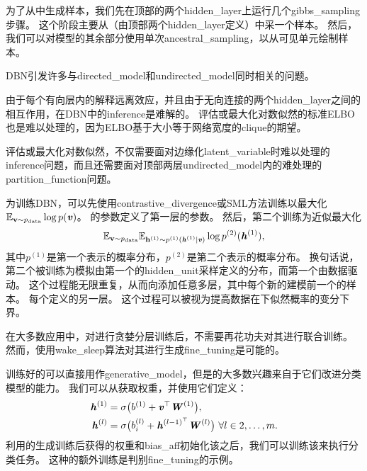 
为了从中生成样本，我们先在顶部的两个\gls{hidden_layer}上运行几个\gls{gibbs_sampling}步骤。
这个阶段主要从（由顶部两个\gls{hidden_layer}定义）中采一个样本。
然后，我们可以对模型的其余部分使用单次\gls{ancestral_sampling}，以从可见单元绘制样本。

\gls{DBN}引发许多与\gls{directed_model}和\gls{undirected_model}同时相关的问题。

由于每个有向层内的解释远离效应，并且由于无向连接的两个\gls{hidden_layer}之间的相互作用，在\gls{DBN}中的\gls{inference}是难解的。
评估或最大化对数似然的标准\gls{ELBO}也是难以处理的，因为\gls{ELBO}基于大小等于网络宽度的\gls{clique}的期望。

评估或最大化对数似然，不仅需要面对边缘化\gls{latent_variable}时难以处理的\gls{inference}问题，而且还需要面对顶部两层\gls{undirected_model}内的难处理的\gls{partition_function}问题。

为训练\gls{DBN}，可以先使用\gls{contrastive_divergence}或\gls{SML}方法训练以最大化$ \mathbb{E}_{\mathbf{v} \sim p_{\text{data}}} \log p(\boldsymbol{\mathit{v}})$。
的参数定义了第一层的参数。
然后，第二个训练为近似最大化
\begin{align}
 \mathbb{E}_{\mathbf{v} \sim p_{\text{data}}}  \mathbb{E}_{\mathbf{h}^{(1)} \sim p^{(1)}(\boldsymbol{\mathit{h}}^{(1)}  \mid  \boldsymbol{\mathit{v}})}  \log p^{(2)}(\boldsymbol{\mathit{h}}^{(1)}) ,
\end{align}
其中$p^{(1)}$是第一个表示的概率分布，$p^{(2)}$是第二个表示的概率分布。
换句话说，第二个被训练为模拟由第一个的\gls{hidden_unit}采样定义的分布，而第一个由数据驱动。
这个过程能无限重复，从而向添加任意多层，其中每个新的建模前一个的样本。
每个定义的另一层。
这个过程可以被视为提高数据在下似然概率的变分下界\citep{Hinton06}。


在大多数应用中，对进行贪婪分层训练后，不需要再花功夫对其进行联合训练。
然而，使用\gls{wake_sleep}算法对其进行生成\gls{fine_tuning}是可能的。


训练好的可以直接用作\gls{generative_model}，但是的大多数兴趣来自于它们改进分类模型的能力。
我们可以从获取权重，并使用它们定义：
\begin{align}
 \boldsymbol{\mathit{h}}^{(1)} &= \sigma \big( b^{(1)} + \boldsymbol{\mathit{v}}^\top \boldsymbol{\mathit{W}}^{(1)} \big), \\
 \boldsymbol{\mathit{h}}^{(l)} &= \sigma \big( b_i^{(l)} + \boldsymbol{\mathit{h}}^{(l-1)^\top}\boldsymbol{\mathit{W}}^{(l)} \big) ~\forall l \in 2, \ldots, m.
\end{align}
利用的生成训练后获得的权重和\gls{bias_aff}初始化该之后，我们可以训练该来执行分类任务。
这种的额外训练是判别\gls{fine_tuning}的示例。


